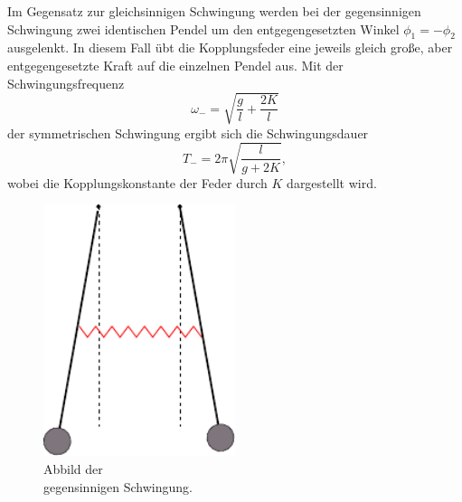 \begin{minipage}[t]{0.5\textwidth}
\label{subsec:Gegen}
Im Gegensatz zur gleichsinnigen Schwingung werden bei der gegensinnigen Schwingung zwei identischen Pendel um den entgegengesetzten Winkel $\phi_1 = -\phi_2$ ausgelenkt.
In diesem Fall übt die Kopplungsfeder eine jeweils gleich große, aber entgegengesetzte Kraft auf die einzelnen Pendel aus.
Mit der Schwingungsfrequenz
\begin{equation}
    \omega_- = \sqrt{\frac{g}{l} + \frac{2K}{l}}
    \label{eqn:omega-}
\end{equation}
der symmetrischen Schwingung ergibt sich die Schwingungsdauer
\begin{equation}
    T_- = 2\pi \sqrt{\frac{l}{g+2K}},
    \label{eqn:T-}
\end{equation}
wobei die Kopplungskonstante der Feder durch $K$ dargestellt wird.
\end{minipage}
\begin{minipage}[t]{0.5\textwidth}
    \begin{figure}[H]
        \centering
        \includegraphics[width=0.5\textwidth]{Abbildungen/Abb_2.pdf}
        \caption{Abbild der \\gegensinnigen Schwingung. \cite{V106}}
        \label{fig:gegen}
      \end{figure}
\end{minipage}
